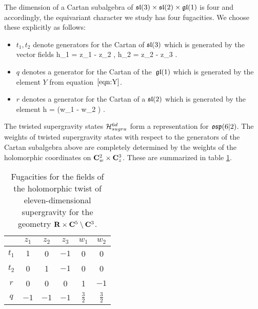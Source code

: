 
The dimension of a Cartan subalgebra of $\mathfrak{sl}(3) \times \mathfrak{sl}(2) \times \mathfrak{gl}(1)$ is four and accordingly, the equivariant character we study has four fugacities.
We choose these explicitly as follows:
\begin{itemize}
  \item $t_{1}, t_{2}$ denote generators for the Cartan of $\mathfrak{sl}(3)$ which is generated by the vector fields
  \beqn
  h_1 = z_1  - z_2  , \quad h_2 = z_2  - z_3 .
  \eeqn
   \item $q$ denotes a generator for the Cartan of the~$\mathfrak{gl}(1)$ which is generated by the element $Y$ from equation~$\eqref{eqn:Y}$. 
  \item $r$ denotes a generator for the Cartan of a $\mathfrak{sl}(2)$ which is generated by the element 
  \beqn
  h =  \left(w_1  - w_2 \right) .
  \eeqn
\end{itemize}

The twisted supergravity states $\mathcal H_{sugra}^{6d}$ form a representation for $\mathfrak{osp}(6|2)$. 
The weights of twisted supergravity states with respect to the generators of the Cartan subalgebra above are completely determined by the weights of the holomorphic coordinates on $\mathbf{C}^2_w \times \mathbf{C}^3_z$.
These are summarized in table \ref{tbl:sugraM5}.

\begin{table}
\begin{center}
\begin{tabular}{c c c c c c}
  & $z_{1}$ & $z_{2}$ & $z_{3}$ & $w_{1}$ & $w_{2}$ \\
  \hline
  $t_{1}$ & $1$ & 0 & $-1$ & 0 & 0 \\
  $t_{2}$ & 0 & 1 & $-1$ & 0 & 0 \\
  $r$ & 0 & 0 & 0 & 1 & $-1$ \\
  $q$ & $-1$ & $-1$ & $-1$ & $\frac{3}{2}$ & $\frac{3}{2}$
\end{tabular}
\caption{Fugacities for the fields of the holomorphic twist of eleven-dimensional supergravity for the geometry $\mathbf{R} \times \mathbf{C}^5 \setminus \mathbf{C}^3$.}
\label{tbl:sugraM5}
\end{center}
\end{table}

